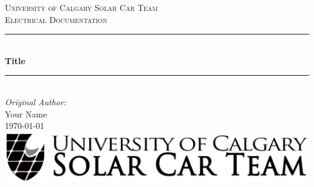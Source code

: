   \begin{titlepage}
  
    \newcommand{\HRule}{\rule{\linewidth}{0.5mm}} %
    
    \center %
     
    
    \textsc{\LARGE University of Calgary Solar Car Team}\\[1.5cm] %
    \textsc{\Large Electrical Documentation}\\[0.5cm] %
    
    
    \HRule \\[0.4cm]
      { \huge \bfseries Title}\\[0.4cm] %
    \HRule \\[1.5cm]
     
    
    \Large \emph{Original Author:}\\
    Your Name \\[3cm] %
    
    
    {\large \today}\\[2cm] %
    
    
    \includegraphics[width=\textwidth]{../Images/Logos/logo-wide.png}\\[1cm] %
     

\end{titlepage}
